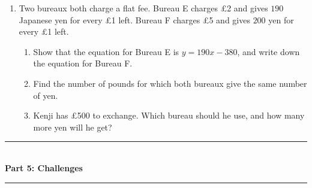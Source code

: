 \documentclass[12pt,a4paper]{article}
\newcommand{\heading}[1]{%
  \vspace{2pt}
  {\color{blue!45!black}\rule{\linewidth}{1pt}}\\[1pt]
  {\large\bfseries #1}\\[-6pt]
  {\color{blue!45!black}\rule{\linewidth}{0.4pt}}
  \vspace{2pt}}
\newcommand{\parttitle}[2]{\heading{Part #1: #2}}
\begin{document}
\begin{enumerate}[resume]
\begin{enumerate}
        \vspace{4em}
  \item Find the number of pounds for which both bureaux give the same number
        of dollars, and how many dollars that is.

        \vspace{9em}
  \item Mia is exchanging \pounds400 for a holiday in New York. Which bureau
        should she use, and how many more dollars will she get?

        \vspace{6em}
\end{enumerate}

\item Two bureaux both charge a flat fee. Bureau E charges \pounds2 and gives
$190$ Japanese yen for every \pounds1 left. Bureau F charges \pounds5 and gives
$200$ yen for every \pounds1 left.
\begin{enumerate}
  \item Show that the equation for Bureau E is $y=190x-380$, and write down
        the equation for Bureau F.

        \vspace{4em}
  \item Find the number of pounds for which both bureaux give the same number
        of yen.

        \vspace{7em}
  \item Kenji has \pounds500 to exchange. Which bureau should he use, and how
        many more yen will he get?

        \vspace{5em}
\end{enumerate}

\end{enumerate}

\newpage

\parttitle{5}{Challenges}
\end{document}
